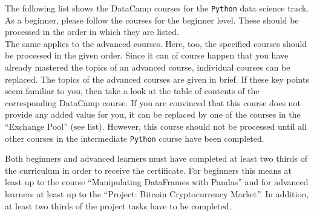 \documentclass[
  11pt,
]{article}
\begin{document}
The following list shows the DataCamp courses for the \texttt{Python} data science track. As a beginner, please follow the courses for the beginner level. These should be processed in the order in which they are listed.\\
The same applies to the advanced courses. Here, too, the specified courses should be processed in the given order. Since it can of course happen that you have already mastered the topics of an advanced course, individual courses can be replaced. The topics of the advanced courses are given in brief. If these key points seem familiar to you, then take a look at the table of contents of the corresponding DataCamp course.
If you are convinced that this course does not provide any added value for you, it can be replaced by one of the courses in the ``Exchange Pool'' (see list). However, this course should not be processed until all other courses in the intermediate \texttt{Python} course have been completed.

Both beginners and advanced learners must have completed at least two thirds of the curriculum in order to receive the certificate. For beginners this means at least up to the course ``Manipulating DataFrames with Pandas'' and for advanced learners at least up to the ``Project: Bitcoin Cryptocurrency Market''. In addition, at least two thirds of the project tasks have to be completed.
\end{document}
